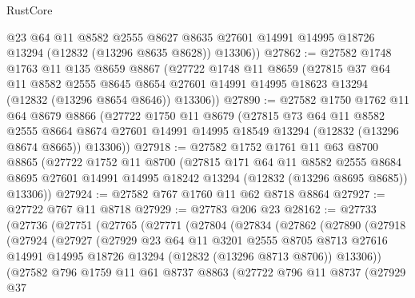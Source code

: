 \begin{lexlean}{RustCore}
\begin{coremodule}
        @23
        @64
        @11
        @8582
        @2555
        @8627
        @8635
        @27601
        @14991
        @14995
        @18726
        @13294
        (@12832 (@13296 @8635 @8628))
        @13306))
@27862 := @27582
    @1748
    @1763
    @11
    @135
    @8659
    @8867
    (@27722
      @1748
      @11
      @8659
      (@27815
        @37
        @64
        @11
        @8582
        @2555
        @8645
        @8654
        @27601
        @14991
        @14995
        @18623
        @13294
        (@12832 (@13296 @8654 @8646))
        @13306))
@27890 := @27582
    @1750
    @1762
    @11
    @64
    @8679
    @8866
    (@27722
      @1750
      @11
      @8679
      (@27815
        @73
        @64
        @11
        @8582
        @2555
        @8664
        @8674
        @27601
        @14991
        @14995
        @18549
        @13294
        (@12832 (@13296 @8674 @8665))
        @13306))
@27918 := @27582
    @1752
    @1761
    @11
    @63
    @8700
    @8865
    (@27722
      @1752
      @11
      @8700
      (@27815
        @171
        @64
        @11
        @8582
        @2555
        @8684
        @8695
        @27601
        @14991
        @14995
        @18242
        @13294
        (@12832 (@13296 @8695 @8685))
        @13306))
@27924 := @27582 @767 @1760 @11 @62 @8718 @8864
@27927 := @27722 @767 @11 @8718
@27929 := @27783 @206 @23
@28162 := @27733
    (@27736
      (@27751
        (@27765
          (@27771
            (@27804
              (@27834
                (@27862
                  (@27890
                    (@27918
                      (@27924
                        (@27927
                          (@27929
                            @23
                            @64
                            @11
                            @3201
                            @2555
                            @8705
                            @8713
                            @27616
                            @14991
                            @14995
                            @18726
                            @13294
                            (@12832 (@13296 @8713 @8706))
                            @13306))
                        (@27582
                          @796
                          @1759
                          @11
                          @61
                          @8737
                          @8863
                          (@27722
                            @796
                            @11
                            @8737
                            (@27929
                              @37

\end{coremodule}
\end{lexlean}
